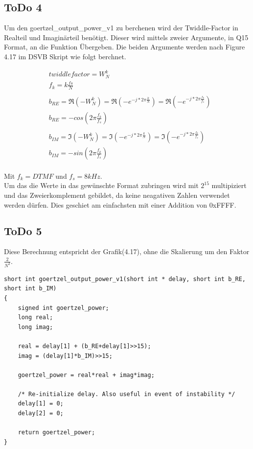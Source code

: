 \documentclass[a4paper,11pt]{article}
\begin{document}
\subsection{ToDo 4}
Um den goertzel\_output\_power\_v1 zu berchenen wird der Twiddle-Factor in Realteil und Imaginärteil benötigt. Dieser wird mittels zweier Argumente, in Q15 Format, an die Funktion Übergeben. Die beiden Argumente werden nach Figure 4.17 im DSVB Skript wie folgt berchnet.

\begin{align*}
	&twiddlefactor = W^{k}_{N} \\
	&f_k = k\frac{fs}{N} \\\\
	&b_{RE} =\Re{(-W^{k}_{N})} = \Re{(-e^{-j*2\pi \frac{k}{N}})}=  \Re{(-e^{-j*2\pi \frac{f_k}{f_s}})}\\
	&b_{RE} = -cos(2\pi\frac{f_k}{f_s})\\\\
	&b_{IM} =\Im{(-W^{k}_{N})} = \Im{(-e^{-j*2\pi \frac{k}{N}})}=  \Im{(-e^{-j*2\pi \frac{f_k}{f_s}})}\\
	&b_{IM} = -sin(2\pi\frac{f_k}{f_s})
\end{align*}
\\
Mit $f_k = DTMF$ und $f_s = 8kHz$.
\\
Um das die Werte in das gewünschte Format zubringen wird mit $2^{15}$ multipiziert und das Zweierkomplement gebildet, da keine neagativen Zahlen verwendet werden dürfen. Dies geschiet am einfachsten mit einer Addition von 0xFFFF.

\subsection{ToDo 5}
Diese Berechnung entspricht der Grafik(4.17), ohne die Skalierung um den Faktor $\frac{2}{N^2}$.
\begin{lstlisting}
short int goertzel_output_power_v1(short int * delay, short int b_RE, short int b_IM)
{
	signed int goertzel_power;
	long real;
	long imag;

	real = delay[1] + (b_RE+delay[1]>>15);
	imag = (delay[1]*b_IM)>>15;

	goertzel_power = real*real + imag*imag;

    /* Re-initialize delay. Also useful in event of instability */
	delay[1] = 0;
	delay[2] = 0;

	return goertzel_power;
}
\end{lstlisting}
\end{document}
